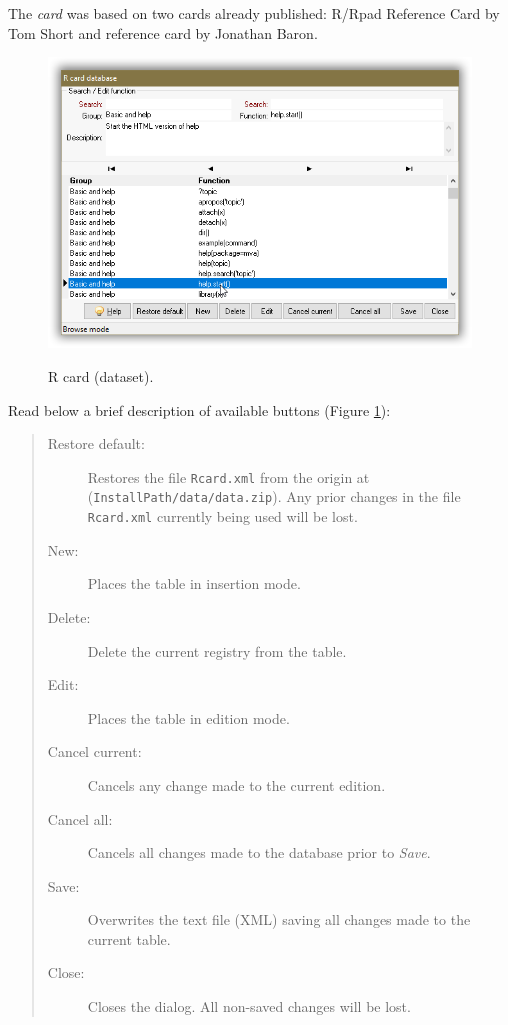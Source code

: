 The \textit{card} was based on two \RR{} cards already published:
R/Rpad Reference Card by Tom Short and \RR{} reference card by Jonathan Baron.

\begin{figure}[H]
  \includegraphics[scale=0.8]{./res/dlg_r_card.png}\\
  \caption{R card (dataset).}
  \label{fig:dlg_r_card}
\end{figure}

Read below a brief description of available buttons (Figure \ref{fig:dlg_r_card}):

\begin{quote}
  \begin{footnotesize}
    \begin{description}
      \item[Restore default:]
        Restores the file \texttt{Rcard.xml} from the origin at
        (\texttt{InstallPath/data/data.zip}). Any prior changes in the
        file \texttt{Rcard.xml} currently being used will be lost.
      \item[New:]
        Places the table in insertion mode.
      \item[Delete:]
        Delete the current registry from the table.
      \item[Edit:]
        Places the table in edition mode.
      \item[Cancel current:]
        Cancels any change made to the current edition.
      \item[Cancel all:]
        Cancels all changes made to the database prior to \textit{Save}.
      \item[Save:]
        Overwrites the text file (XML) saving all changes made to the current table.
      \item[Close:]
        Closes the dialog. All non-saved changes will be lost.
    \end{description}
  \end{footnotesize}
\end{quote}


